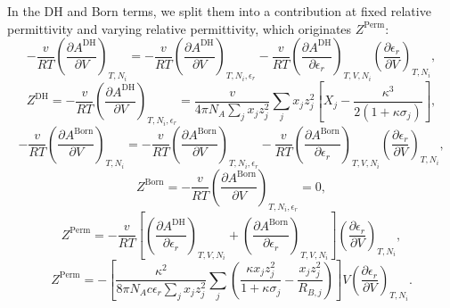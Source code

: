 In the DH and Born terms, we split them into a contribution at fixed relative permittivity and varying relative permittivity, which originates $Z^\text{Perm}$:
\begin{equation}
        - \frac{v}{RT}\left (  \frac{\partial A^\text{DH}}{\partial V} \right )_{T,N_i} = - \frac{v}{RT}\left (  \frac{\partial A^\text{DH}}{\partial V} \right )_{T,N_i,\epsilon_r} - \frac{v}{RT}\left (  \frac{\partial A^\text{DH}}{\partial \epsilon_r} \right )_{T, V, N_i}\left (  \frac{\partial \epsilon_r}{\partial V} \right )_{T, N_i},
        \label{Eq:ZDH_cont}
\end{equation}
\begin{equation}
        Z^\text{DH} = - \frac{v}{RT}\left (  \frac{\partial A^\text{DH}}{\partial V} \right )_{T,N_i,\epsilon_r} = \frac{v}{4\pi N_A  \sum_j x_j z_j^2}\sum_j x_j z_j^2 \left [ X_j - \frac{\kappa^3}{2\left ( 1 + \kappa \sigma_j  \right )} \right ],
        \label{Eq:ZDH}
\end{equation}
\begin{equation}
        - \frac{v}{RT}\left (  \frac{\partial A^\text{Born}}{\partial V} \right )_{T,N_i} = - \frac{v}{RT}\left (  \frac{\partial A^\text{Born}}{\partial V} \right )_{T,N_i,\epsilon_r} - \frac{v}{RT}\left (  \frac{\partial A^\text{Born}}{\partial \epsilon_r} \right )_{T, V, N_i}\left (  \frac{\partial \epsilon_r}{\partial V} \right )_{T, N_i},
        \label{Eq:ZBorn_cont}
\end{equation}
\begin{equation}
        Z^\text{Born}  = - \frac{v}{RT}\left (  \frac{\partial A^\text{Born}}{\partial V} \right )_{T,N_i,\epsilon_r} = 0,
        \label{Eq:ZBorn}
\end{equation}
\begin{equation}
        Z^\text{Perm} = - \frac{v}{RT}\left [ \left (  \frac{\partial A^\text{DH}}{\partial \epsilon_r} \right )_{T, V, N_i}  +\left (  \frac{\partial A^\text{Born}}{\partial \epsilon_r} \right )_{T, V, N_i} \right ]\left (  \frac{\partial \epsilon_r}{\partial V} \right )_{T, N_i},
        \label{Eq:ZPerm_cont}
\end{equation}
\begin{equation}
        Z^{\text{Perm}} =  -\left [ \frac{\kappa^2}{8\pi N_A c \epsilon_r \sum_j x_j z_j^2}\sum_j \left (  \frac{\kappa x_j z_j^2}{1+\kappa \sigma_j} - \frac{ x_j z_j^2}{R_{B,j}} \right )  \right ] V \left  (  \frac{\partial \epsilon_r}{\partial V} \right )_{T, N_i}.
        \label{Eq:ZPerm}
\end{equation} 

